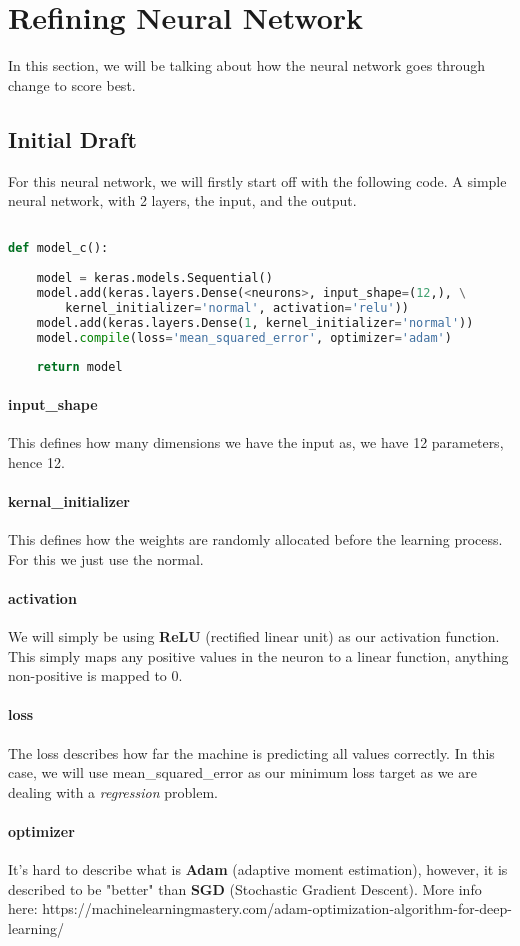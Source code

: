 

\section{Refining Neural Network}

In this section, we will be talking about how the neural network goes through change to score best.

\subsection{Initial Draft}

For this neural network, we will firstly start off with the following code. A simple neural network, with 2 layers, the input, and the output.

\begin{lstlisting}[language=Python]

def model_c():
    
    model = keras.models.Sequential()
    model.add(keras.layers.Dense(<neurons>, input_shape=(12,), \
		kernel_initializer='normal', activation='relu'))
    model.add(keras.layers.Dense(1, kernel_initializer='normal'))
    model.compile(loss='mean_squared_error', optimizer='adam')
   
    return model

\end{lstlisting}

\paragraph{input\_shape} This defines how many dimensions we have the input as, we have 12 parameters, hence 12.

\paragraph{kernal\_initializer} This defines how the weights are randomly allocated before the learning process. For this we just use the normal.

\paragraph{activation} We will simply be using \textbf{ReLU} (rectified linear unit) as our activation function. This simply maps any positive values in the neuron to a linear function, anything non-positive is mapped to 0.

\paragraph{loss} The loss describes how far the machine is predicting all values correctly. In this case, we will use mean\_squared\_error as our minimum loss target as we are dealing with a \textit{regression} problem.

\paragraph{optimizer} It's hard to describe what is \textbf{Adam} (adaptive moment estimation), however, it is described to be "better" than \textbf{SGD} (Stochastic Gradient Descent). More info here: https://machinelearningmastery.com/adam-optimization-algorithm-for-deep-learning/



